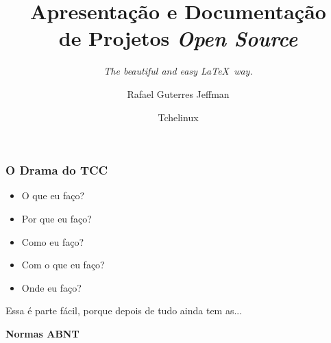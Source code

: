 \documentclass[aspectratio=43,14pt]{beamer}
\title[]{Apresentação e Documentação \\ de Projetos \emph{Open Source}}
\subtitle[]{\emph{The beautiful and easy \LaTeX\ way.}}
\author[]{Rafael Guterres Jeffman}
\institute[]{}
\date{Tchelinux}
\begin{document}
\begin{frame}
    \titlepage
\end{frame}

\begin{frame}[c]
    \frametitle{O Drama do TCC}
    \begin{itemize}
    \item{O que eu faço?}
    \item{Por que eu faço?}
    \item{Como eu faço?}
    \item{Com o que eu faço?}
    \item{Onde eu faço?}
    \end{itemize}
\end{frame}

\begin{frame}
    \vfill
    \begin{center}
    \large Essa é parte fácil, porque depois de tudo ainda tem as...
    \end{center}
\end{frame}

\begin{frame}[t]
    \vfill
    \begin{center}
    \color{white} \Huge \textbf{Normas ABNT}
    \end{center}
    \vfill
\end{frame}
\end{document}
